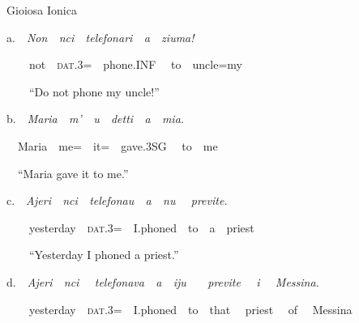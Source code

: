 \documentclass[output=paper,modfonts,nonflat]{langsci/langscibook}
\begin{document}
\begin{listWWNumviiileveli}
\item 
\begin{styleListParagraph}
\ \ Gioiosa Ionica
\end{styleListParagraph}
\end{listWWNumviiileveli}
\begin{styleListParagraph}
\ \ a.\ \ \textit{Non\ \ nci\ \ telefonari\ \ a\ \ ziuma!}
\end{styleListParagraph}

\begin{styleStandard}
\ \ \ \ \ \ not\ \ \textsc{dat}.3=\ \ phone.INF \ \ to\ \ uncle=my
\end{styleStandard}

\begin{styleStandard}
\ \ \ \ \ \ “Do not phone my uncle!”
\end{styleStandard}

\begin{styleStandard}
\ \ b.\ \ \textit{Maria\ \ m’\ \ u\ \ detti\ \ a\ \ mia.}
\end{styleStandard}

\begin{styleStandard}
\ \ \ \ Maria\ \ me=\ \ it=\ \ gave.3SG \ \ to\ \ me
\end{styleStandard}

\begin{styleStandard}
\ \ \ \ “Maria gave it to me.”
\end{styleStandard}

\begin{styleStandard}
\ \ c.\ \ \textit{Ajeri\ \ nci\ \ telefonau\ \ a\ \ nu \ \ previte.}
\end{styleStandard}

\begin{styleStandard}
\ \ \ \ \ \ yesterday\ \ \textsc{dat}.3=\ \ I.phoned\ \ to\ \ a\ \ priest 
\end{styleStandard}

\begin{styleStandard}
\ \ \ \ \ \ “Yesterday I phoned a priest.”
\end{styleStandard}

\begin{styleStandard}
\ \ d.\ \ \textit{Ajeri\ \ nci \ \ telefonava\ \ a\ \ iju \ \ \ previte \ \ i \ \ Messina.}
\end{styleStandard}

\begin{styleStandard}
\ \ \ \ \ \ yesterday\ \ \textsc{dat}.3=\ \ I.phoned\ \ to\ \ that \ \ priest \ \ of \ \ Messina
\end{styleStandard}
\end{document}
